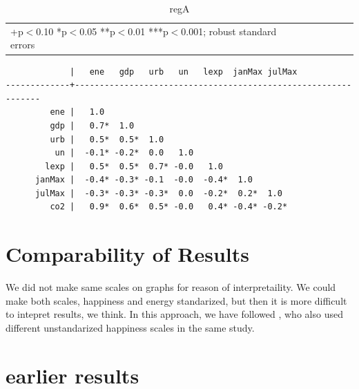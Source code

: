 \documentclass[10pt, letterpaper]{article}
\begin{document}
\begin{spacing}{1.4}
\begin{table}[H]\centering \caption{regA} \label{regA} \begin{scriptsize} \begin{tabular}{p{1.4in}p{.43in}p{.43in}p{.43in}p{.43in}p{.43in}p{.43in}p{.43in}p{.43in}p{.43in}p{.43 in}p{.43in}p{.43 in}}\hline  \hline\multicolumn{6}{l}{+p$<$0.10 *p$<$0.05 **p$<$0.01 ***p$<$0.001; robust standard errors} \end{tabular}\end{scriptsize}\end{table}

\begin{verbatim}
             |   ene   gdp   urb   un   lexp  janMax julMax
-------------+---------------------------------------------------------------
         ene |   1.0 
         gdp |   0.7*  1.0 
         urb |   0.5*  0.5*  1.0 
          un |  -0.1* -0.2*  0.0   1.0 
        lexp |   0.5*  0.5*  0.7* -0.0   1.0 
      janMax |  -0.4* -0.3* -0.1  -0.0  -0.4*  1.0 
      julMax |  -0.3* -0.3* -0.3*  0.0  -0.2*  0.2*  1.0 
         co2 |   0.9*  0.6*  0.5* -0.0   0.4* -0.4* -0.2*

\end{verbatim}


\section{Comparability of Results}

We did not make same scales on graphs for reason of interpretaility. We could
make both scales, happiness and energy standarized, but then it is more
difficult to intepret results, we think. In this approach, we have followed
\citet{easterlin10B,easterlin12}, who also used different unstandarized
happiness scales in the same study. 

\section{earlier results}



\end{spacing}
\end{document}
